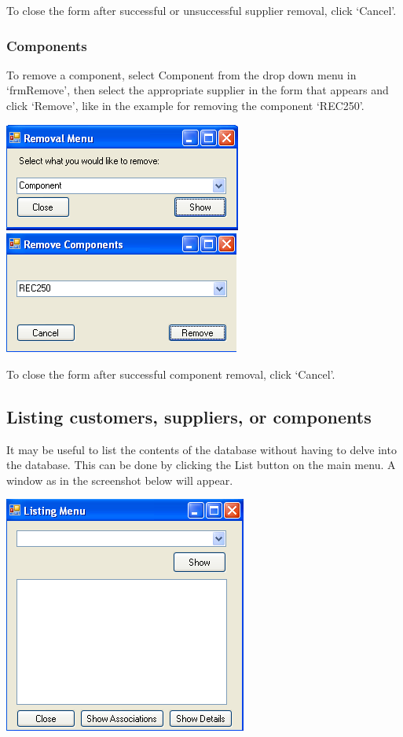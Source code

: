 		To close the form after successful or unsuccessful supplier removal, click `Cancel'.
		
		\subsubsection{Components}
		
		To remove a component, select Component from the drop down menu in `frmRemove', then select the appropriate supplier in the form that appears and click `Remove', like in the example for removing the component `REC250'.
		
		\includegraphics[scale=0.5]{component-frmRemove_scrot}
		\includegraphics[scale=0.5]{component-frmRemoveComponent_scrot}
		
		To close the form after successful component removal, click `Cancel'.
		
	\subsection{Listing customers, suppliers, or components}
	
	It may be useful to list the contents of the database without having to delve into the database.  This can be done by clicking the List button on the main menu.  A window as in the screenshot below will appear.
	
	\includegraphics[scale=0.5]{frmList_scrot}
	
